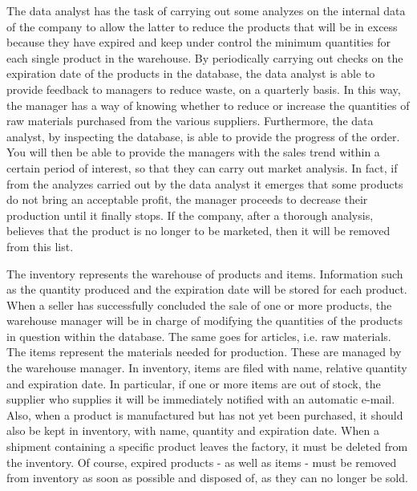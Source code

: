 The data analyst has the task of carrying out some analyzes on the internal data of the company to allow the latter to reduce the products that will be in excess because they have expired and keep under control the minimum quantities for each single product in the warehouse. By periodically carrying out checks on the expiration date of the products in the database, the data analyst is able to provide feedback to managers to reduce waste, on a quarterly basis. In this way, the manager has a way of knowing whether to reduce or increase the quantities of raw materials purchased from the various suppliers. Furthermore, the data analyst, by inspecting the database, is able to provide the progress of the order. You will then be able to provide the managers with the sales trend within a certain period of interest, so that they can carry out market analysis. In fact, if from the analyzes carried out by the data analyst it emerges that some products do not bring an acceptable profit, the manager proceeds to decrease their production until it finally stops. If the company, after a thorough analysis, believes that the product is no longer to be marketed, then it will be removed from this list.

The inventory represents the warehouse of products and items. Information such as the quantity produced and the expiration date will be stored for each product. When a seller has successfully concluded the sale of one or more products, the warehouse manager will be in charge of modifying the quantities of the products in question within the database. The same goes for articles, i.e. raw materials.
The items represent the materials needed for production. These are managed by the warehouse manager.
In inventory, items are filed with name, relative quantity and expiration date. In particular, if one or more items are out of stock, the supplier who supplies it will be immediately notified with an automatic e-mail. Also, when a product is manufactured but has not yet been purchased, it should also be kept in inventory, with name, quantity and expiration date. When a shipment containing a specific product leaves the factory, it must be deleted from the inventory. Of course, expired products - as well as items - must be removed from inventory as soon as possible and disposed of, as they can no longer be sold.

